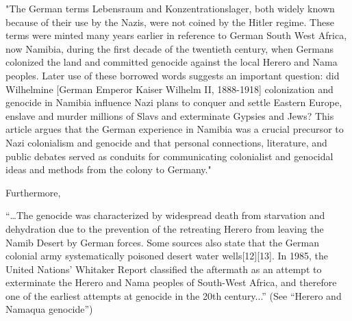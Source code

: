 \begin{myquote}
"The German terms Lebensraum and Konzentrationslager, both widely known because of their use by the Nazis, were not coined by the Hitler regime. These terms were minted many years earlier in reference to German South West Africa, now Namibia, during the first decade of the twentieth century, when Germans colonized the land and committed genocide against the local Herero and Nama peoples. Later use of these borrowed words suggests an important question: did Wilhelmine [German Emperor Kaiser Wilhelm II, 1888-1918] colonization and genocide in Namibia  influence Nazi plans to conquer and settle Eastern Europe, enslave and murder millions of Slavs and exterminate Gypsies and Jews? This article argues that the German experience in Namibia was a crucial precursor to Nazi colonialism and genocide and that personal connections, literature, and public debates served as conduits for communicating colonialist and genocidal ideas and methods from the colony to Germany."
\end{myquote}

Furthermore, 
\begin{myquote}
“…The genocide was characterized by widespread death from starvation and dehydration due to the prevention of the retreating Herero from leaving the Namib Desert by German forces. Some sources also state that the German colonial army systematically poisoned desert water wells[12][13]. In 1985, the United Nations' Whitaker Report classified the aftermath as an attempt to exterminate the Herero and Nama peoples of South-West Africa, and therefore one of the earliest attempts at genocide in the 20th century...” \hfill(See “Herero and Namaqua genocide”)
\end{myquote}

